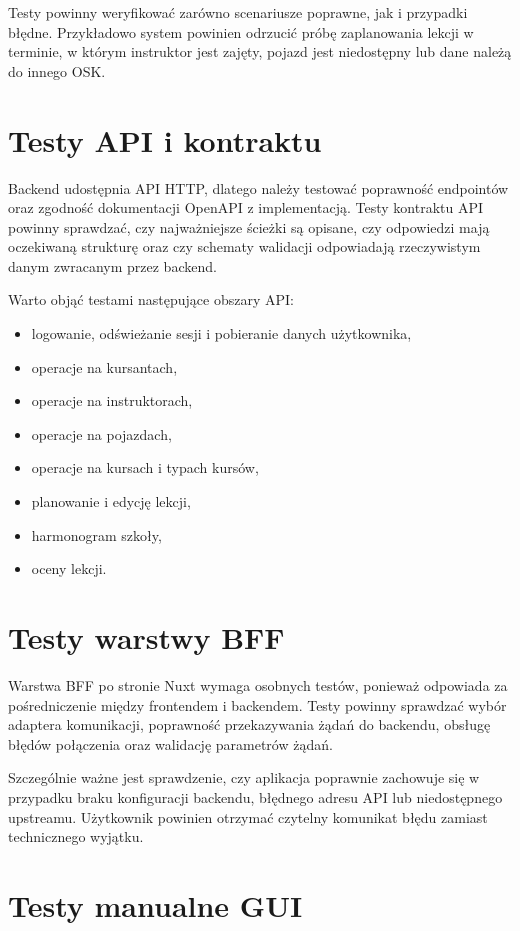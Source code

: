 Testy powinny weryfikować zarówno scenariusze poprawne, jak i przypadki błędne. Przykładowo system powinien odrzucić próbę zaplanowania lekcji w terminie, w którym instruktor jest zajęty, pojazd jest niedostępny lub dane należą do innego OSK.

\section{Testy API i kontraktu}
\label{sec:testy-api}

Backend udostępnia API HTTP, dlatego należy testować poprawność endpointów oraz zgodność dokumentacji OpenAPI z implementacją. Testy kontraktu API powinny sprawdzać, czy najważniejsze ścieżki są opisane, czy odpowiedzi mają oczekiwaną strukturę oraz czy schematy walidacji odpowiadają rzeczywistym danym zwracanym przez backend.

Warto objąć testami następujące obszary API:
\begin{itemize}
    \item logowanie, odświeżanie sesji i pobieranie danych użytkownika,
    \item operacje na kursantach,
    \item operacje na instruktorach,
    \item operacje na pojazdach,
    \item operacje na kursach i typach kursów,
    \item planowanie i edycję lekcji,
    \item harmonogram szkoły,
    \item oceny lekcji.
\end{itemize}

\section{Testy warstwy BFF}
\label{sec:testy-bff}

Warstwa BFF po stronie Nuxt wymaga osobnych testów, ponieważ odpowiada za pośredniczenie między frontendem i backendem. Testy powinny sprawdzać wybór adaptera komunikacji, poprawność przekazywania żądań do backendu, obsługę błędów połączenia oraz walidację parametrów żądań.

Szczególnie ważne jest sprawdzenie, czy aplikacja poprawnie zachowuje się w przypadku braku konfiguracji backendu, błędnego adresu API lub niedostępnego upstreamu. Użytkownik powinien otrzymać czytelny komunikat błędu zamiast technicznego wyjątku.

\section{Testy manualne GUI}
\label{sec:testy-manualne-gui}

